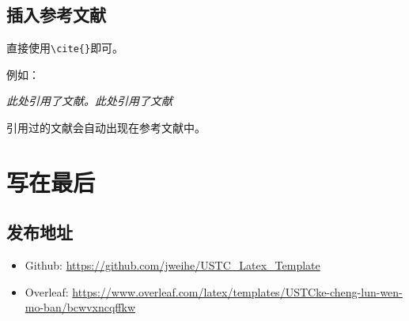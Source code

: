 \documentclass[12pt,hyperref,a4paper,UTF8]{ctexart}
\begin{document}
%
%
%
%
%
%

\subsection{插入参考文献}
直接使用\verb|\cite{}|即可。

例如：


\textit{ 此处引用了文献\cite{0Isaac}。此处引用了文献\cite{2016The}}


引用过的文献会自动出现在参考文献中。

\section{写在最后}
\subsection{发布地址}
\begin{itemize}
    \item Github: \url{https://github.com/jweihe/USTC_Latex_Template}
    \item Overleaf:  \url{https://www.overleaf.com/latex/templates/USTCke-cheng-lun-wen-mo-ban/bcwvxncqffkw}
\end{itemize}


\end{document}
